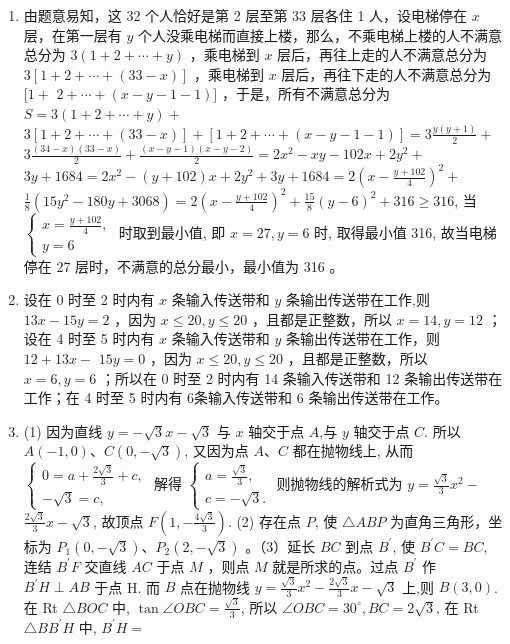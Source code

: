 \documentclass[10pt]{article}
\begin{document}
\begin{enumerate}
  \item 由题意易知，这 32 个人恰好是第 2 层至第 33 层各住 1 人，设电梯停在 $x$ 层，在第一层有 $y$ 个人没乘电梯而直接上楼，那么，不乘电梯上楼的人不满意总分为 $3(1+2+\cdots+y)$ ，乘电梯到 $x$ 层后，再往上走的人不满意总分为\\
$3[1+2+\cdots+(33-x)]$ ，乘电梯到 $x$ 层后，再往下走的人不满意总分为 $[1+$ $2+\cdots+(x-y-1-1)]$ ，于是，所有不满意总分为 $S=3(1+2+\cdots+y)+$ $3[1+2+\cdots+(33-x)]+[1+2+\cdots+(x-y-1-1)]=3 \frac{y(y+1)}{2}+$ $3 \frac{(34-x)(33-x)}{2}+\frac{(x-y-1)(x-y-2)}{2}=2 x^{2}-x y-102 x+2 y^{2}+$ $3 y+1684=2 x^{2}-(y+102) x+2 y^{2}+3 y+1684=2\left(x-\frac{y+102}{4}\right)^{2}+$ $\frac{1}{8}\left(15 y^{2}-180 y+3068\right)=2\left(x-\frac{y+102}{4}\right)^{2}+\frac{15}{8}(y-6)^{2}+316 \geqslant 316$, 当 $\left\{\begin{array}{l}x=\frac{y+102}{4}, \\ y=6\end{array}\right.$ 时取到最小值, 即 $x=27, y=6$ 时, 取得最小值 316, 故当电梯停在 27 层时，不满意的总分最小，最小值为 316 。
  \item 设在 0 时至 2 时内有 $x$ 条输入传送带和 $y$ 条输出传送带在工作,则 $13 x-15 y=2$ ，因为 $x \leqslant 20, y \leqslant 20$ ，且都是正整数，所以 $x=14, y=12$ ；设在 4 时至 5 时内有 $x$ 条输入传送带和 $y$ 条输出传送带在工作，则 $12+13 x-$ $15 y=0$ ，因为 $x \leqslant 20, y \leqslant 20$ ，且都是正整数，所以 $x=6, y=6$ ；所以在 0 时至 2 时内有 14 条输入传送带和 12 条输出传送带在工作；在 4 时至 5 时内有 6条输入传送带和 6 条输出传送带在工作。
  \item (1) 因为直线 $y=-\sqrt{3} x-\sqrt{3}$ 与 $x$ 轴交于点 $A$,与 $y$ 轴交于点 $C$. 所以 $A(-1,0) 、 C(0,-\sqrt{3})$, 又因为点 $A 、 C$ 都在抛物线上, 从而 $\left\{\begin{array}{l}0=a+\frac{2 \sqrt{3}}{3}+c, \\ -\sqrt{3}=c,\end{array}\right.$ 解得 $\left\{\begin{array}{l}a=\frac{\sqrt{3}}{3}, \\ c=-\sqrt{3} .\end{array}\right.$ 则抛物线的解析式为 $y=\frac{\sqrt{3}}{3} x^{2}-$ $\frac{2 \sqrt{3}}{3} x-\sqrt{3}$, 故顶点 $F\left(1,-\frac{4 \sqrt{3}}{3}\right)$. (2) 存在点 $P$, 使 $\triangle A B P$ 为直角三角形，坐标为 $P_{1}(0,-\sqrt{3}) 、 P_{2}(2,-\sqrt{3})$ 。（3）延长 $B C$ 到点 $B^{\prime}$, 使 $B^{\prime} C=B C$, 连结 $B^{\prime} F$ 交直线 $A C$ 于点 $M$ ，则点 $M$ 就是所求的点。过点 $B^{\prime}$ 作 $B^{\prime} H \perp A B$ 于点 H. 而 $B$ 点在抛物线 $y=\frac{\sqrt{3}}{3} x^{2}-\frac{2 \sqrt{3}}{3} x-\sqrt{3}$ 上,则 $B(3,0)$. 在 Rt $\triangle B O C$ 中, $\tan \angle O B C=\frac{\sqrt{3}}{3}$, 所以 $\angle O B C=30^{\circ}, B C=2 \sqrt{3}$, 在 Rt $\triangle B B^{\prime} H$ 中, $B^{\prime} H=$\\

\end{enumerate}
\end{document}
